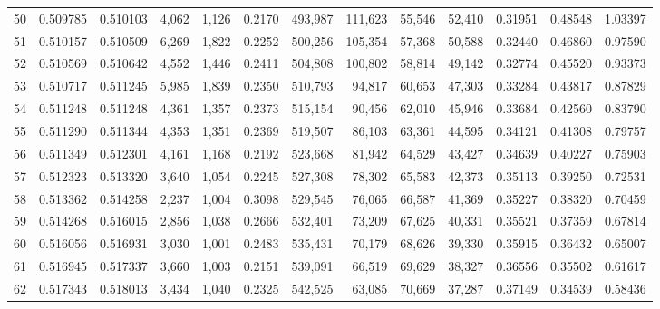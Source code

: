 \begin{tabular}{rrrrrrrrrrrrr}
50 &  0.509785 &  0.510103 &   4,062 &  1,126 &                                     0.2170 &  493,987 &  111,623 &   55,546 &   52,410 &  0.31951 &  0.48548 &  1.03397 \\
51 &  0.510157 &  0.510509 &   6,269 &  1,822 &                                     0.2252 &  500,256 &  105,354 &   57,368 &   50,588 &  0.32440 &  0.46860 &  0.97590 \\
52 &  0.510569 &  0.510642 &   4,552 &  1,446 &                                     0.2411 &  504,808 &  100,802 &   58,814 &   49,142 &  0.32774 &  0.45520 &  0.93373 \\
53 &  0.510717 &  0.511245 &   5,985 &  1,839 &                                     0.2350 &  510,793 &   94,817 &   60,653 &   47,303 &  0.33284 &  0.43817 &  0.87829 \\
54 &  0.511248 &  0.511248 &   4,361 &  1,357 &                                     0.2373 &  515,154 &   90,456 &   62,010 &   45,946 &  0.33684 &  0.42560 &  0.83790 \\
55 &  0.511290 &  0.511344 &   4,353 &  1,351 &                                     0.2369 &  519,507 &   86,103 &   63,361 &   44,595 &  0.34121 &  0.41308 &  0.79757 \\
56 &  0.511349 &  0.512301 &   4,161 &  1,168 &                                     0.2192 &  523,668 &   81,942 &   64,529 &   43,427 &  0.34639 &  0.40227 &  0.75903 \\
57 &  0.512323 &  0.513320 &   3,640 &  1,054 &                                     0.2245 &  527,308 &   78,302 &   65,583 &   42,373 &  0.35113 &  0.39250 &  0.72531 \\
58 &  0.513362 &  0.514258 &   2,237 &  1,004 &                                     0.3098 &  529,545 &   76,065 &   66,587 &   41,369 &  0.35227 &  0.38320 &  0.70459 \\
59 &  0.514268 &  0.516015 &   2,856 &  1,038 &                                     0.2666 &  532,401 &   73,209 &   67,625 &   40,331 &  0.35521 &  0.37359 &  0.67814 \\
60 &  0.516056 &  0.516931 &   3,030 &  1,001 &                                     0.2483 &  535,431 &   70,179 &   68,626 &   39,330 &  0.35915 &  0.36432 &  0.65007 \\
61 &  0.516945 &  0.517337 &   3,660 &  1,003 &                                     0.2151 &  539,091 &   66,519 &   69,629 &   38,327 &  0.36556 &  0.35502 &  0.61617 \\
62 &  0.517343 &  0.518013 &   3,434 &  1,040 &                                     0.2325 &  542,525 &   63,085 &   70,669 &   37,287 &  0.37149 &  0.34539 &  0.58436 \\

\end{tabular}
